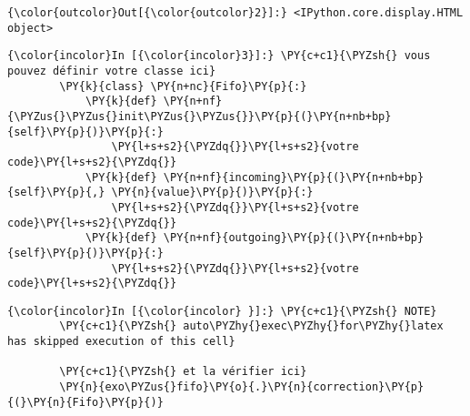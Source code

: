 \begin{Verbatim}[commandchars=\\\{\},frame=single,framerule=0.3mm,rulecolor=\color{cellframecolor}]
{\color{outcolor}Out[{\color{outcolor}2}]:} <IPython.core.display.HTML object>
\end{Verbatim}
            
    \begin{Verbatim}[commandchars=\\\{\},frame=single,framerule=0.3mm,rulecolor=\color{cellframecolor}]
{\color{incolor}In [{\color{incolor}3}]:} \PY{c+c1}{\PYZsh{} vous pouvez définir votre classe ici}
        \PY{k}{class} \PY{n+nc}{Fifo}\PY{p}{:}
            \PY{k}{def} \PY{n+nf}{\PYZus{}\PYZus{}init\PYZus{}\PYZus{}}\PY{p}{(}\PY{n+nb+bp}{self}\PY{p}{)}\PY{p}{:}
                \PY{l+s+s2}{\PYZdq{}}\PY{l+s+s2}{votre code}\PY{l+s+s2}{\PYZdq{}}
            \PY{k}{def} \PY{n+nf}{incoming}\PY{p}{(}\PY{n+nb+bp}{self}\PY{p}{,} \PY{n}{value}\PY{p}{)}\PY{p}{:}
                \PY{l+s+s2}{\PYZdq{}}\PY{l+s+s2}{votre code}\PY{l+s+s2}{\PYZdq{}}
            \PY{k}{def} \PY{n+nf}{outgoing}\PY{p}{(}\PY{n+nb+bp}{self}\PY{p}{)}\PY{p}{:}
                \PY{l+s+s2}{\PYZdq{}}\PY{l+s+s2}{votre code}\PY{l+s+s2}{\PYZdq{}}
\end{Verbatim}


    \begin{Verbatim}[commandchars=\\\{\},frame=single,framerule=0.3mm,rulecolor=\color{cellframecolor}]
{\color{incolor}In [{\color{incolor} }]:} \PY{c+c1}{\PYZsh{} NOTE}
        \PY{c+c1}{\PYZsh{} auto\PYZhy{}exec\PYZhy{}for\PYZhy{}latex has skipped execution of this cell}
        
        \PY{c+c1}{\PYZsh{} et la vérifier ici}
        \PY{n}{exo\PYZus{}fifo}\PY{o}{.}\PY{n}{correction}\PY{p}{(}\PY{n}{Fifo}\PY{p}{)}
\end{Verbatim}



    
    
    
